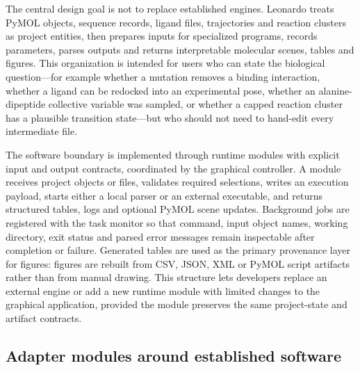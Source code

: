 \documentclass[pdflatex,sn-vancouver-num]{sn-jnl}
\begin{document}
The central design goal is not to replace established engines.  Leonardo treats PyMOL objects, sequence records, ligand files, trajectories and reaction clusters as project entities, then prepares inputs for specialized programs, records parameters, parses outputs and returns interpretable molecular scenes, tables and figures.  This organization is intended for users who can state the biological question---for example whether a mutation removes a binding interaction, whether a ligand can be redocked into an experimental pose, whether an alanine-dipeptide collective variable was sampled, or whether a capped reaction cluster has a plausible transition state---but who should not need to hand-edit every intermediate file.

The software boundary is implemented through runtime modules with explicit input and output contracts, coordinated by the graphical controller.  A module receives project objects or files, validates required selections, writes an execution payload, starts either a local parser or an external executable, and returns structured tables, logs and optional PyMOL scene updates.  Background jobs are registered with the task monitor so that command, input object names, working directory, exit status and parsed error messages remain inspectable after completion or failure.  Generated tables are used as the primary provenance layer for figures: figures are rebuilt from CSV, JSON, XML or PyMOL script artifacts rather than from manual drawing.  This structure lets developers replace an external engine or add a new runtime module with limited changes to the graphical application, provided the module preserves the same project-state and artifact contracts.

\subsection{Adapter modules around established software}
\end{document}
